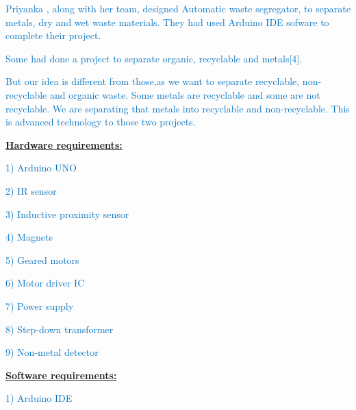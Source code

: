 \documentclass[12pt]{article}
\begin{document}
\textcolor[HTML]{0070C0}{Priyanka , along with her team, designed Automatic waste segregator, to separate metals, dry and wet waste materials. They had used Arduino IDE sofware to complete their project. }\par

\textcolor[HTML]{0070C0}{Some had done a project to separate organic, recyclable and metals[4]. }\par

\textcolor[HTML]{0070C0}{But our idea is different from those,as we want to separate recyclable, non-recyclable and organic waste. Some metals are recyclable and some are not recyclable. We are separating that metals into recyclable and non-recyclable. This is advanced technology to those two projects. }\par


\vspace{\baselineskip}
{\fontsize{14pt}{16.8pt}\selectfont \textbf{\uline{Hardware requirements:}}\par}\par

\textcolor[HTML]{0070C0}{1) Arduino UNO}\par

\textcolor[HTML]{0070C0}{2) IR sensor}\par

\textcolor[HTML]{0070C0}{3) Inductive proximity sensor}\par

\textcolor[HTML]{0070C0}{4) Magnets}\par

\textcolor[HTML]{0070C0}{5) Geared motors}\par

\textcolor[HTML]{0070C0}{6) Motor driver IC}\par

\textcolor[HTML]{0070C0}{7) Power supply}\par

\textcolor[HTML]{0070C0}{8) Step-down transformer}\par

\textcolor[HTML]{0070C0}{9) Non-metal detector}\par


\vspace{\baselineskip}
{\fontsize{14pt}{16.8pt}\selectfont \textbf{\uline{Software requirements:}}\par}\par

\textcolor[HTML]{0070C0}{1) Arduino IDE}\par
\end{document}

